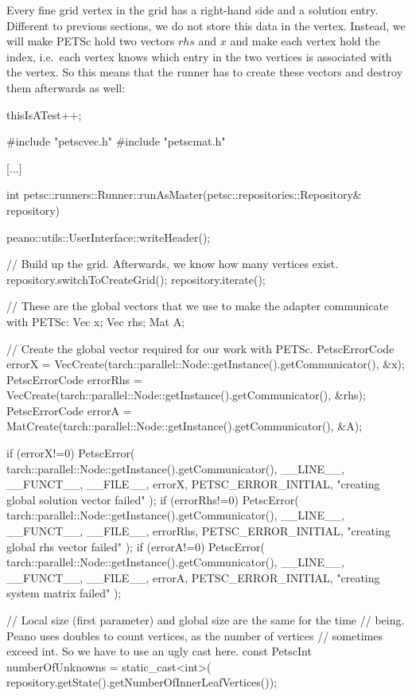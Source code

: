 Every fine grid vertex in the grid has a right-hand side and a solution entry. 
Different to previous sections, we do not store this data in the vertex.
Instead, we will make PETSc hold two vectors $rhs$ and $x$ and
make each vertex hold the index, i.e.~each vertex knows which entry in the two
vertices is associated with the vertex.
So this means that the runner has to create these vectors and destroy them
afterwards as well:

\begin{code}
  thisIsATest++;
\end{code}

\begin{code}
#include "petscvec.h"
#include "petscmat.h"

[...]

int petsc::runners::Runner::runAsMaster(petsc::repositories::Repository& repository) {
  peano::utils::UserInterface::writeHeader();

  // Build up the grid. Afterwards, we know how many vertices exist.
  repository.switchToCreateGrid(); repository.iterate();


  // These are the global vectors that we use to make the adapter communicate with PETSc:
  Vec  x;
  Vec  rhs;
  Mat  A;

  // Create the global vector required for our work with PETSc.
  PetscErrorCode errorX   = 
    VecCreate(tarch::parallel::Node::getInstance().getCommunicator(), &x);
  PetscErrorCode errorRhs = 
    VecCreate(tarch::parallel::Node::getInstance().getCommunicator(), &rhs);
  PetscErrorCode errorA   = 
    MatCreate(tarch::parallel::Node::getInstance().getCommunicator(), &A);

  if (errorX!=0) {
    PetscError( tarch::parallel::Node::getInstance().getCommunicator(),
      __LINE__,  __FUNCT__,  __FILE__, errorX,  PETSC_ERROR_INITIAL,
      "creating global solution vector failed" );
  }
  if (errorRhs!=0) {
    PetscError( tarch::parallel::Node::getInstance().getCommunicator(),
      __LINE__,  __FUNCT__,  __FILE__, errorRhs,  PETSC_ERROR_INITIAL,
      "creating global rhs vector failed" );
  }
  if (errorA!=0) {
    PetscError( tarch::parallel::Node::getInstance().getCommunicator(),
      __LINE__,  __FUNCT__,  __FILE__, errorA,  PETSC_ERROR_INITIAL,
      "creating system matrix failed" );
  }


  // Local size (first parameter) and global size are the same for the time
  // being. Peano uses doubles to count vertices, as the number of vertices
  // sometimes exceed int. So we have to use an ugly cast here.
  const PetscInt numberOfUnknowns = static_cast<int>(
    repository.getState().getNumberOfInnerLeafVertices());

}
\end{code}
